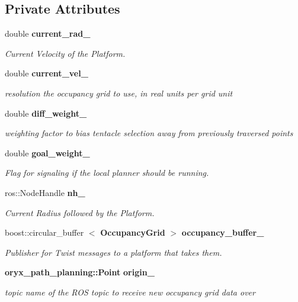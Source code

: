 \subsection*{\-Private \-Attributes}
\begin{DoxyCompactItemize}
\item 
double {\bf current\-\_\-rad\-\_\-}
\begin{DoxyCompactList}\small\item\em \-Current \-Velocity of the \-Platform. \end{DoxyCompactList}\item 
double {\bf current\-\_\-vel\-\_\-}
\begin{DoxyCompactList}\small\item\em resolution the occupancy grid to use, in real units per grid unit \end{DoxyCompactList}\item 
double {\bf diff\-\_\-weight\-\_\-}
\begin{DoxyCompactList}\small\item\em weighting factor to bias tentacle selection away from previously traversed points \end{DoxyCompactList}\item 
double {\bf goal\-\_\-weight\-\_\-}
\begin{DoxyCompactList}\small\item\em \-Flag for signaling if the local planner should be running. \end{DoxyCompactList}\item 
ros\-::\-Node\-Handle {\bf nh\-\_\-}
\begin{DoxyCompactList}\small\item\em \-Current \-Radius followed by the \-Platform. \end{DoxyCompactList}\item 
boost\-::circular\-\_\-buffer\*
$<$ {\bf \-Occupancy\-Grid} $>$ {\bf occupancy\-\_\-buffer\-\_\-}
\begin{DoxyCompactList}\small\item\em \-Publisher for \-Twist messages to a platform that takes them. \end{DoxyCompactList}\item 
{\bf oryx\-\_\-path\-\_\-planning\-::\-Point} {\bf origin\-\_\-}
\begin{DoxyCompactList}\small\item\em topic name of the \-R\-O\-S topic to receive new occupancy grid data over \end{DoxyCompactList}\item 

\end{DoxyCompactItemize}
